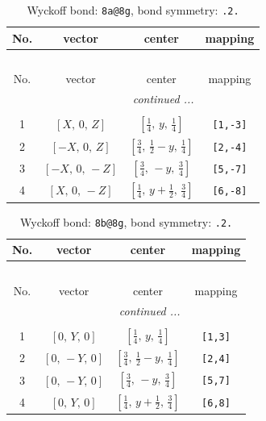 \documentclass[fleqn,8pt]{jsarticle}
\begin{document}
\begin{longtable}{cccc}
\caption{Wyckoff bond: {\tt 8a@8g}, bond symmetry: {\tt .2.}}
 \\
 \hline \hline
No. & vector & center & mapping \\ \hline \endfirsthead

\multicolumn{3}{l}{\tablename\ \thetable{}} \\
 \hline \hline
No. & vector & center & mapping \\ \hline \endhead

 \hline \hline
\multicolumn{3}{r}{\footnotesize\it continued ...} \\ \endfoot

 \hline \hline
\multicolumn{3}{r}{} \\ \endlastfoot

1 & $\left[ X,\, 0,\, Z \right]$ & $\left[ \frac{1}{4},\, y,\, \frac{1}{4} \right]$ & {\tt [1,-3]} \\ \hline
2 & $\left[ - X,\, 0,\, Z \right]$ & $\left[ \frac{3}{4},\, \frac{1}{2} - y,\, \frac{1}{4} \right]$ & {\tt [2,-4]} \\ \hline
3 & $\left[ - X,\, 0,\, - Z \right]$ & $\left[ \frac{3}{4},\, - y,\, \frac{3}{4} \right]$ & {\tt [5,-7]} \\ \hline
4 & $\left[ X,\, 0,\, - Z \right]$ & $\left[ \frac{1}{4},\, y + \frac{1}{2},\, \frac{3}{4} \right]$ & {\tt [6,-8]} \\
\end{longtable}
\renewcommand{\arraystretch}{1.2}
\begin{longtable}{cccc}
\caption{Wyckoff bond: {\tt 8b@8g}, bond symmetry: {\tt .2.}}
 \\
 \hline \hline
No. & vector & center & mapping \\ \hline \endfirsthead

\multicolumn{3}{l}{\tablename\ \thetable{}} \\
 \hline \hline
No. & vector & center & mapping \\ \hline \endhead

 \hline \hline
\multicolumn{3}{r}{\footnotesize\it continued ...} \\ \endfoot

 \hline \hline
\multicolumn{3}{r}{} \\ \endlastfoot

1 & $\left[ 0,\, Y,\, 0 \right]$ & $\left[ \frac{1}{4},\, y,\, \frac{1}{4} \right]$ & {\tt [1,3]} \\ \hline
2 & $\left[ 0,\, - Y,\, 0 \right]$ & $\left[ \frac{3}{4},\, \frac{1}{2} - y,\, \frac{1}{4} \right]$ & {\tt [2,4]} \\ \hline
3 & $\left[ 0,\, - Y,\, 0 \right]$ & $\left[ \frac{3}{4},\, - y,\, \frac{3}{4} \right]$ & {\tt [5,7]} \\ \hline
4 & $\left[ 0,\, Y,\, 0 \right]$ & $\left[ \frac{1}{4},\, y + \frac{1}{2},\, \frac{3}{4} \right]$ & {\tt [6,8]} \\
\end{longtable}
\end{document}
